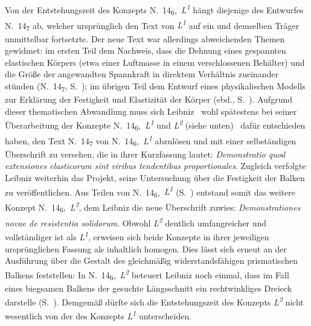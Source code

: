 \pend%
\pstart%
Von der Entstehungszeit des Konzepts N.~14\textsubscript{6},~\textit{L\textsuperscript{1}} hängt diejenige des Entwurfes N.~14\textsubscript{7} ab, welcher ursprünglich den Text von \textit{L\textsuperscript{1}} auf ein und demselben Träger unmittelbar fortsetzte.
Der neue Text war allerdings abweichenden Themen gewidmet: im ersten Teil dem Nachweis, dass die Dehnung eines gespannten elastischen Körpers (etwa einer Luftmasse in einem verschlossenen Behälter) und die Größe der angewandten Spannkraft in direktem Verhältnis zueinander stünden (N.~14\textsubscript{7}, S.~); im übrigen Teil dem Entwurf eines physikalischen Modells zur Erklärung der Festigkeit und Elastizität der Körper (ebd., S.~).
Aufgrund dieser thematischen Abwandlung muss sich Leibniz \textendash\ wohl spätestens bei seiner Überarbeitung der Konzepte N.~14\textsubscript{6},~\textit{L\textsuperscript{1}} und \textit{L\textsuperscript{2}} (siehe unten) \textendash\ dafür entschieden haben, den Text N.~14\textsubscript{7} von N.~14\textsubscript{6},~\textit{L\textsuperscript{1}} abzulösen und mit einer selbständigen Überschrift zu versehen, die in ihrer Kurzfassung lautet: \textit{Demonstratio quod extensiones elasticorum sint viribus tendentibus proportionales}.
\pend%
\pstart%
Zugleich verfolgte Leibniz weiterhin das Projekt, seine Untersuchung über die Festigkeit der Balken zu veröffentlichen.
Aus Teilen von N.~14\textsubscript{6},~\textit{L\textsuperscript{1}} (S.~) entstand somit das weitere Konzept N.~14\textsubscript{6},~\textit{L\textsuperscript{2}}, dem Leibniz die neue Überschrift zuwies: \textit{Demonstrationes novae de resistentia solidorum}.
Obwohl \textit{L\textsuperscript{2}} deutlich umfangreicher und vollständiger ist als \textit{L\textsuperscript{1}}, erweisen sich beide Konzepte in ihrer jeweiligen ursprünglichen Fassung als inhaltlich homogen.
Dies lässt sich erneut an der Ausführung über die Gestalt des gleichmäßig widerstandsfähigen prismatischen Balkens feststellen:
In N.~14\textsubscript{6},~\textit{L\textsuperscript{2}} beteuert
Leibniz noch einmal, dass im Fall eines biegsamen Balkens der gesuchte Längsschnitt ein rechtwinkliges Dreieck darstelle (S.~).
Demgemäß dürfte sich die Entstehungszeit des Konzepts \textit{L\textsuperscript{2}} nicht wesentlich von der des Konzepts \textit{L\textsuperscript{1}} unterscheiden.
